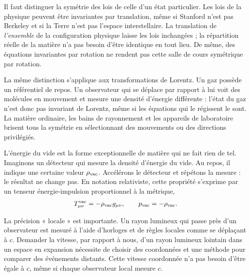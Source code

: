 Il faut distinguer la symétrie des lois de celle d’un état particulier. Les lois de la physique peuvent être invariantes par translation, même si Stanford n’est pas Berkeley et si la Terre n’est pas l’espace interstellaire. La translation de \emph{l’ensemble} de la configuration physique laisse les lois inchangées ; la répartition réelle de la matière n’a pas besoin d’être identique en tout lieu. De même, des équations invariantes par rotation ne rendent pas cette salle de cours symétrique par rotation.

La même distinction s’applique aux transformations de Lorentz. Un gaz possède un référentiel de repos. Un observateur qui se déplace par rapport à lui voit des molécules en mouvement et mesure une densité d’énergie différente : l’état du gaz n’est donc pas invariant de Lorentz, même si les équations qui le régissent le sont. La matière ordinaire, les bains de rayonnement et les appareils de laboratoire brisent tous la symétrie en sélectionnant des mouvements ou des directions privilégiés.

L’énergie du vide est la forme exceptionnelle de matière qui ne fait rien de tel. Imaginons un détecteur qui mesure la densité d’énergie du vide. Au repos, il indique une certaine valeur \(\rho_{\rm vac}\). Accélérons le détecteur et répétons la mesure : le résultat ne change pas. En notation relativiste, cette propriété s’exprime par un tenseur énergie-impulsion proportionnel à la métrique,
\begin{equation}
T_{\mu\nu}^{\rm vac}=-\rho_{\rm vac}g_{\mu\nu},
\qquad
p_{\rm vac}=-\rho_{\rm vac}.
\label{eq:l08-vacuum-stress}
\end{equation}

La précision « locale » est importante. Un rayon lumineux qui passe près d’un observateur est mesuré à l’aide d’horloges et de règles locales comme se déplaçant à \(c\). Demander la vitesse, par rapport à nous, d’un rayon lumineux lointain dans un espace en expansion nécessite de choisir des coordonnées et une méthode pour comparer des événements distants. Cette vitesse coordonnée n’a pas besoin d’être égale à \(c\), même si chaque observateur local mesure \(c\).

\begin{classroomqa}
\end{classroomqa}

